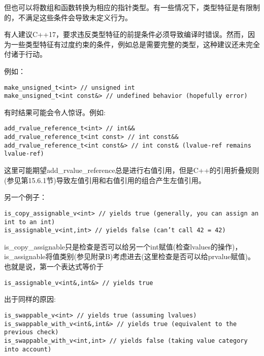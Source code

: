 但也可以将数组和函数转换为相应的指针类型。有一些情况下，类型特征是有限制的，不满足这些条件会导致未定义行为。

\begin{tcolorbox}[colback=webgreen!5!white,colframe=webgreen!75!black]
\hspace*{0.75cm}有人建议C++17，要求违反类型特征的前提条件必须导致编译时错误。然而，因为一些类型特征有过度约束的条件，例如总是需要完整的类型，这种建议还未完全付诸于行动。
\end{tcolorbox}

例如：

\begin{lstlisting}[style=styleCXX]
make_unsigned_t<int> // unsigned int
make_unsigned_t<int const&> // undefined behavior (hopefully error)
\end{lstlisting}

有时结果可能会令人惊讶。例如:

\begin{lstlisting}[style=styleCXX]
add_rvalue_reference_t<int> // int&&
add_rvalue_reference_t<int const> // int const&&
add_rvalue_reference_t<int const&> // int const& (lvalue-ref remains lvalue-ref)
\end{lstlisting}

这里可能期望add\_rvalue\_reference总是进行右值引用，但是C++的引用折叠规则(参见第15.6.1节)导致左值引用和右值引用的组合产生左值引用。

另一个例子：

\begin{lstlisting}[style=styleCXX]
is_copy_assignable_v<int> // yields true (generally, you can assign an int to an int)
is_assignable_v<int,int> // yields false (can’t call 42 = 42)
\end{lstlisting}

is\_copy\_assignable只是检查是否可以给另一个int赋值(检查lvalues的操作)，is\_assignable将值类别(参见附录B)考虑进去(这里检查是否可以给prvalue赋值)。也就是说，第一个表达式等价于

\begin{lstlisting}[style=styleCXX]
is_assignable_v<int&,int&> // yields true
\end{lstlisting}

出于同样的原因:

\begin{lstlisting}[style=styleCXX]
is_swappable_v<int> // yields true (assuming lvalues)
is_swappable_with_v<int&,int&> // yields true (equivalent to the previous check)
is_swappable_with_v<int,int> // yields false (taking value category into account)
\end{lstlisting}

